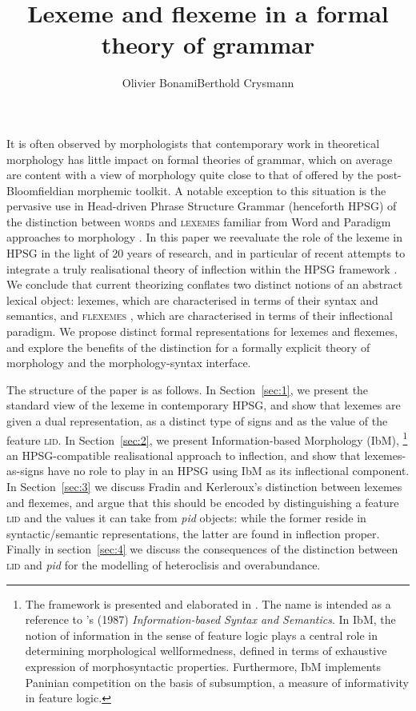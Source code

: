 \documentclass[output=paper]{langsci/langscibook}
\author{Olivier Bonami\affiliation{Laboratoire de linguistique    formelle, Université Paris Diderot}\lastand  Berthold Crysmann\affiliation{Laboratoire de linguistique    formelle, CNRS}}
\title{Lexeme and flexeme in a formal theory of grammar}
\newcommand{\BC}[2]{#2}
\begin{document}



It is often observed by morphologists that contemporary work in
theoretical morphology has little impact on formal theories of
grammar, which on average are content with a view of morphology quite
close to that of offered by the post-Bloomfieldian morphemic
toolkit.
A notable exception to this
situation is the pervasive use in Head-driven Phrase Structure Grammar
(henceforth HPSG) of the distinction between \textsc{words} and
\textsc{lexemes} familiar from Word and Paradigm approaches to
morphology \citep[see among many
others][]{Robins59,Hockett67,Matthews72,Zwicky85,Anderson92,Aronoff94,Stump01,Blevins14}. In
this paper we reevaluate the role of the lexeme in HPSG in the light
of 20 years of research, and in particular of recent attempts to
integrate a truly realisational theory of inflection within the HPSG
framework \citep{Crysmann14}. We conclude that current theorizing
conflates two distinct notions of an abstract lexical object: lexemes,
which are characterised in terms of their syntax and semantics, and
\textsc{flexemes} \citep{Fradin03b}, which are characterised in terms
of their inflectional paradigm. We propose distinct formal
representations for lexemes and flexemes, and explore the benefits of
the distinction for a formally explicit theory of morphology and the
morphology-syntax interface.

The structure of the paper is as follows. In Section~\ref{sec:1}, we present the
standard view of the lexeme in contemporary HPSG, and show that
lexemes are given a dual representation, as a distinct type of signs
and as the value of the feature \textsc{lid}. In Section~\ref{sec:2}, we present
Information-based Morphology (IbM),%
\footnote{The framework is presented and elaborated in
  \citet{Bonami13d,Bonami15b,Crysmann:14:OUP,Crysmann14}. The name is
  intended as a reference to \citeauthor{Pollard87}'s (1987)
  \emph{Information-based Syntax and Semantics}. \BC{}{In IbM, the
    notion of information in the sense of feature logic plays a
    central role in determining morphological wellformedness, defined
    in terms of exhaustive expression of morphosyntactic
    properties. Furthermore, IbM implements Paninian competition on
    the basis of subsumption, a measure of informativity in feature
    logic.} } an HPSG-compatible realisational approach to inflection,
and show that lexemes-as-signs have no role to play in an HPSG using
IbM as its inflectional component. In Section~\ref{sec:3} we discuss Fradin and
Kerleroux's distinction between lexemes and flexemes, and argue that
this should be encoded by distinguishing a feature \textsc{lid} and
the values it can take from \textit{pid} objects: while the former
reside in syntactic/semantic representations, the latter are found in
inflection proper. Finally in section~\ref{sec:4} we discuss the consequences of
the distinction between \textsc{lid} and \textit{pid} for the
modelling of heteroclisis and overabundance.
\end{document}
